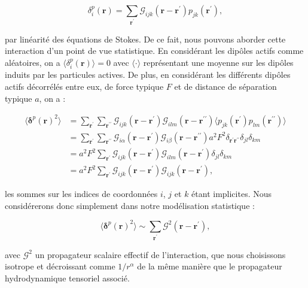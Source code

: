\begin{equation}
	\delta^p_i(\mathbf{r}) = \sum_{\mathbf{r}^\prime}\mathcal{G}_{ijk}(\mathbf{r}-\mathbf{r}^\prime)p_{jk}(\mathbf{r}^\prime),
\end{equation}

\noindent par linéarité des équations de Stokes. De ce fait, nous pouvons aborder cette interaction d'un point de vue statistique. En considérant les dipôles actifs comme aléatoires, on a $\langle \delta^p_i(\mathbf{r}) \rangle = 0$ avec $\langle \cdot \rangle$ représentant une moyenne sur les dipôles induits par les particules actives. De plus, en considérant les différents dipôles actifs décorrélés entre eux, de force typique $F$ et de distance de séparation typique $a$, on a :

\begin{equation}
\begin{aligned}
	\langle\boldsymbol\delta^p(\mathbf{r})^2\rangle &= \sum_{\mathbf{r}^\prime}\sum_{\mathbf{r}^{\prime\prime}}\mathcal{G}_{ijk}(\mathbf{r}-\mathbf{r}^\prime)\mathcal{G}_{ilm}(\mathbf{r}-\mathbf{r}^{\prime\prime})\langle p_{jk}(\mathbf{r}^\prime)p_{lm}(\mathbf{r}^{\prime\prime})\rangle \\
	&= \sum_{\mathbf{r}^\prime}\sum_{\mathbf{r}^{\prime\prime}}\mathcal{G}_{i\alpha}(\mathbf{r}-\mathbf{r}^\prime)\mathcal{G}_{i\beta}(\mathbf{r}-\mathbf{r}^{\prime\prime})a^2F^2\delta_{\mathbf{r}^\prime\mathbf{r}^{\prime\prime}}\delta_{jl}\delta_{km}\\
	&= a^2 F^2\sum_{\mathbf{r}^\prime}\mathcal{G}_{ijk}(\mathbf{r}-\mathbf{r}^\prime)\mathcal{G}_{ilm}(\mathbf{r}-\mathbf{r}^{\prime})\delta_{jl}\delta_{km}\\
	&= a^2 F^2 \sum_{\mathbf{r}^\prime}\mathcal{G}_{ijk}(\mathbf{r}-\mathbf{r}^\prime)\mathcal{G}_{ijk}(\mathbf{r}-\mathbf{r}^{\prime}),
\end{aligned}
\end{equation}

\noindent les sommes sur les indices de coordonnées $i$, $j$ et $k$ étant implicites. Nous considérerons donc simplement dans notre modélisation statistique :

\begin{equation}
	\langle \boldsymbol\delta^p(\mathbf{r})^2 \rangle \sim \sum_{\mathbf{r}^\prime} \mathcal{G}^2(\mathbf{r}-\mathbf{r}^\prime),
	\label{eq:convol_model}
\end{equation}

\noindent avec $\mathcal{G}^2$ un propagateur scalaire effectif de l'interaction, que nous choisissons isotrope et décroissant comme $1/r^{\alpha}$ de la même manière que le propagateur hydrodynamique tensoriel associé.

